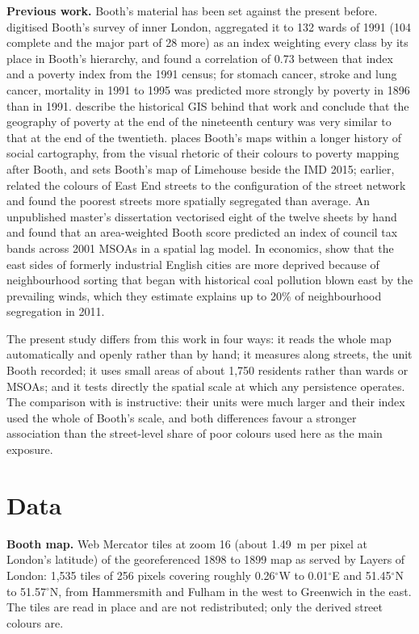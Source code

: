 \documentclass[11pt,a4paper]{article}
\begin{document}
\textbf{Previous work.} Booth's material has been set against the present before. \citet{dorling2000} digitised Booth's survey of inner London, aggregated it to 132 wards of 1991 (104 complete and the major part of 28 more) as an index weighting every class by its place in Booth's hierarchy, and found a correlation of 0.73 between that index and a poverty index from the 1991 census; for stomach cancer, stroke and lung cancer, mortality in 1991 to 1995 was predicted more strongly by poverty in 1896 than in 1991. \citet{orford2002} describe the historical GIS behind that work and conclude that the geography of poverty at the end of the nineteenth century was very similar to that at the end of the twentieth. \citet{vaughan2018} places Booth's maps within a longer history of social cartography, from the visual rhetoric of their colours to poverty mapping after Booth, and sets Booth's map of Limehouse beside the IMD 2015; earlier, \citet{vaughan2005} related the colours of East End streets to the configuration of the street network and found the poorest streets more spatially segregated than average. An unpublished master's dissertation \citep{low2019} vectorised eight of the twelve sheets by hand and found that an area-weighted Booth score predicted an index of council tax bands across 2001 MSOAs in a spatial lag model. In economics, \citet{heblich2021} show that the east sides of formerly industrial English cities are more deprived because of neighbourhood sorting that began with historical coal pollution blown east by the prevailing winds, which they estimate explains up to 20\% of neighbourhood segregation in 2011.

The present study differs from this work in four ways: it reads the whole map automatically and openly rather than by hand; it measures along streets, the unit Booth recorded; it uses small areas of about 1,750 residents rather than wards or MSOAs; and it tests directly the spatial scale at which any persistence operates. The comparison with \citet{dorling2000} is instructive: their units were much larger and their index used the whole of Booth's scale, and both differences favour a stronger association than the street-level share of poor colours used here as the main exposure.

\section{Data}\label{sec:data}

\textbf{Booth map.} Web Mercator tiles at zoom 16 (about 1.49~m per pixel at London's latitude) of the georeferenced 1898 to 1899 map as served by Layers of London: 1,535 tiles of 256 pixels covering roughly 0.26$^\circ$W to 0.01$^\circ$E and 51.45$^\circ$N to 51.57$^\circ$N, from Hammersmith and Fulham in the west to Greenwich in the east. The tiles are read in place and are not redistributed; only the derived street colours are.
\end{document}
